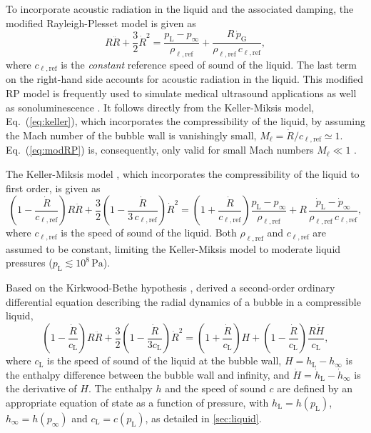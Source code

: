 To incorporate acoustic radiation in the liquid and the associated damping, the modified Rayleigh-Plesset model is given as \citep{Brenner2002}
\begin{equation}
R \ddot{R} + \frac{3}{2} \dot{R}^2 = \frac{p_\text{L} - p_\infty}{\rho_{\ell,\mathrm{ref}}} + \frac{R \, \dot{p}_\text{G}}{\rho_{\ell,\mathrm{ref}} \, c_{\ell,\mathrm{ref}}} ,
\label{eq:modRP}
\end{equation}
where $c_{\ell,\mathrm{ref}}$ is the \textit{constant} reference speed of sound of the liquid. The last term on the right-hand side accounts for acoustic radiation in the liquid.
This modified RP model is frequently used to simulate medical ultrasound applications \citep{Versluis2020} as well as sonoluminescence \citep{Brenner2002}.
It follows directly from the Keller-Miksis model, Eq.~(\ref{eq:keller}), which incorporates the compressibility of the liquid, by assuming the Mach number of the bubble wall is vanishingly small, $M_\ell = \dot{R}/c_{\ell,\mathrm{ref}} \simeq 1$. Eq.~(\ref{eq:modRP}) is, consequently, only valid for small Mach numbers $M_\ell \ll 1$ \citep{Neppiras1980, Prosperetti1986}.

The Keller-Miksis model \citep{Keller1980, Prosperetti1986}, which incorporates the compressibility of the liquid to first order, is given as
\begin{equation}
\left(1 - \frac{\dot{R}}{c_{\ell,\mathrm{ref}}}\right) R \ddot{R} + \frac{3}{2} \left(1 - \frac{\dot{R}}{3\, c_{\ell,\mathrm{ref}}}\right) \dot{R}^2 =  \left(1 + \frac{\dot{R}}{c_{\ell,\mathrm{ref}}}\right) \frac{p_\text{L} - p_\infty}{\rho_{\ell,\mathrm{ref}}} + R \, \frac{\dot{p}_\text{L} - \dot{p}_\infty}{\rho_{\ell,\mathrm{ref}} \, c_{\ell,\mathrm{ref}}} ,
\label{eq:keller}
\end{equation}
where $c_{\ell,\mathrm{ref}}$ is the speed of sound of the liquid. Both $\rho_{\ell,\mathrm{ref}}$ and $c_{\ell,\mathrm{ref}}$ are assumed to be constant, limiting the Keller-Miksis model to moderate liquid pressures ($p_\mathrm{L} \lesssim 10^8 \, \mathrm{Pa}$).

Based on the Kirkwood-Bethe hypothesis \citep{Kirkwood1942,Cole1948}, \citet{Gilmore1952} derived a second-order ordinary differential equation describing the radial dynamics of a bubble in a compressible liquid, %
\begin{equation}
  \left( 1 - \frac{\dot{R}}{c_\text{L}} \right) R \ddot{R} + \frac{3}{2} \left( 1 - \frac{\dot{R}}{3 c_\text{L}} \right) \dot{R}^2  = \left( 1 + \frac{\dot{R}}{c_\text{L}} \right) H + \left( 1- \frac{\dot{R}}{c_\text{L}} \right) \frac{R \dot{H}}{c_\text{L}}, \label{eq:gilmore}
\end{equation} 
where $c_\mathrm{L}$ is the speed of sound of the liquid at the bubble wall, $H = h_\text{L} - h_\infty$ is the enthalpy difference between the bubble wall and infinity, and $\dot{H} = \dot{h}_\text{L} - \dot{h}_\infty$ is the derivative of $H$. The enthalpy $h$ and the speed of sound $c$ are defined by an appropriate equation of state as a function of pressure, with $h_\text{L} = h(p_\text{L})$, $h_\infty = h(p_\infty)$ and $c_\text{L} = c(p_\text{L})$, as detailed in \ref{sec:liquid}.

